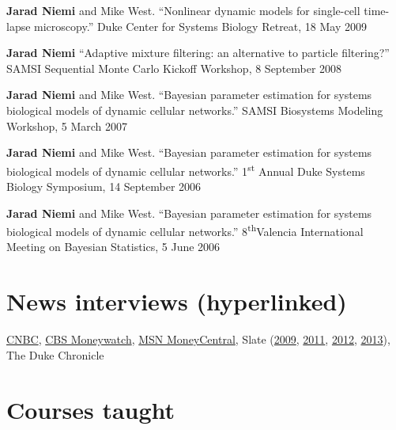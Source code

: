 \documentclass[overlapped,line]{res}
\begin{document}
\begin{resume}
{{\bf Jarad Niemi} and Mike West. ``Nonlinear dynamic models for single-cell time-lapse microscopy.'' Duke Center for Systems Biology Retreat, 18 May 2009

{\bf Jarad Niemi} ``Adaptive mixture filtering: an alternative to particle filtering?'' SAMSI Sequential Monte Carlo Kickoff Workshop, 8 September 2008

{\bf Jarad Niemi} and Mike West. ``Bayesian parameter estimation for systems biological models of dynamic cellular networks.'' SAMSI Biosystems Modeling Workshop, 5 March 2007

{\bf Jarad Niemi} and Mike West. ``Bayesian parameter estimation for systems biological models of dynamic cellular networks.'' 1\textsuperscript{st} Annual Duke Systems Biology Symposium, 14 September 2006

{\bf Jarad Niemi} and Mike West. ``Bayesian parameter estimation for systems biological models of dynamic cellular networks.'' 8\textsuperscript{th}Valencia International Meeting on Bayesian Statistics, 5 June 2006

}

\section{\bf News interviews (hyperlinked)}

\href{http://www.nbcnews.com/business/slam-dunk-your-rivals-office-march-madness-pool-1C8912546}{CNBC}, %
\href{http://moneywatch.bnet.com/economic-news/article/ncaa-brackets-how-to-win-your-march-madness-pool/403055/?tag=main;related-link-0}{CBS Moneywatch}, 
\href{http://articles.moneycentral.msn.com/SmartSpending/blog/page.aspx?post=1704157}{MSN MoneyCentral}, 
Slate (\href{http://www.slate.com/id/2213974/pagenum/all/}{2009}, \href{http://www.slate.com/id/2288234/pagenum/all/}{2011}, 
\href{http://www.slate.com/articles/sports/sports_nut/2012/03/ncaa_basketball_tournament_bracket_act_like_a_hedge_fund_manager_and_pick_ohio_state_to_win_it_all_.single.html}{2012}, 
\href{http://www.slate.com/articles/sports/sports_nut/2012/03/ncaa_basketball_tournament_bracket_act_like_a_hedge_fund_manager_and_pick_ohio_state_to_win_it_all_.single.html}{2013}),
The Duke Chronicle





\newpage

\section{\bf Courses taught}
\vspace{0.1in}


\end{resume}
\end{document}
